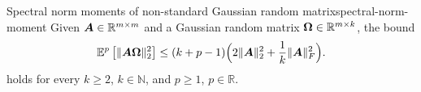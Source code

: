 \begin{lemma}{Spectral norm moments of non-standard Gaussian random matrix}{spectral-norm-moment}
    Given $\boldsymbol{A} \in \mathbb{R}^{m \times m}$ and a Gaussian random matrix $\boldsymbol{\Omega} \in \mathbb{R}^{m \times k}$, the bound
    \begin{equation}
        \mathbb{E}^{p}\left[ \lVert \boldsymbol{A} \boldsymbol{\Omega} \rVert _2^2 \right]
        \leq  (k + p-1) \Big( 2 \lVert \boldsymbol{A} \rVert _2^2 + \frac{1}{k} \lVert \boldsymbol{A} \rVert _F^2 \Big).
    \end{equation}
    holds for every $k \ge 2$, $k\in \mathbb{N}$, and $p \ge 1$, $p\in \mathbb R$.
\end{lemma}
